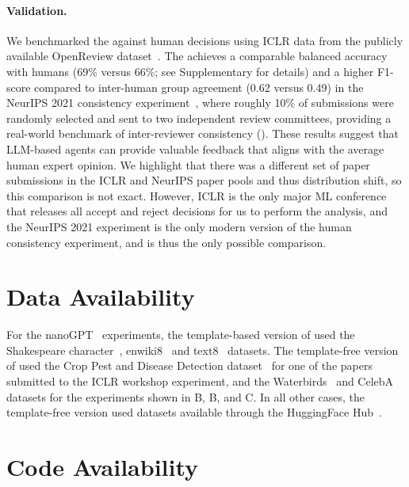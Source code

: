 \paragraph{Validation.}

We benchmarked the \ourreviewer against human decisions using ICLR data from the publicly available OpenReview dataset~\citep{gonzalez2024learning}. 
The \ourreviewer achieves a comparable balanced accuracy with humans (69\% versus 66\%; see Supplementary  for details) and a higher F1-score compared to inter-human group agreement (0.62 versus 0.49) in the NeurIPS 2021 consistency experiment~\citep{beygelzimer2021neurips}, where roughly 10\% of submissions were randomly selected and sent to two independent review committees, providing a real-world benchmark of inter-reviewer consistency ().
These results suggest that LLM-based agents can provide valuable feedback that aligns with the average human expert opinion.
We highlight that there was a different set of paper submissions in the ICLR and NeurIPS paper pools and thus distribution shift, so this comparison is not exact.
However, ICLR is the only major ML conference that releases all accept and reject decisions for us to perform the analysis, and the NeurIPS 2021 experiment is the only modern version of the human consistency experiment, and is thus the only possible comparison.

\newpage
\section*{Data Availability}

For the nanoGPT~\citep{karpathy2022nanogpt} experiments, the template-based version of \ouralgo used the Shakespeare character~\citep{char_shakespeare}, enwiki8~\citep{hutter_prize} and text8~\citep{text8} datasets.
The template-free version of \ouralgo used the Crop Pest and Disease Detection dataset~\citep{mensah2023crop} for one of the papers submitted to the ICLR workshop experiment, and the Waterbirds~\citep{waterbirds_dataset} and CelebA~\citep{liu2015faceattributes} datasets for the experiments shown in B, B, and C.
In all other cases, the template-free version used datasets available through the HuggingFace Hub~\citep{wolf2020huggingface}.


\section*{Code Availability}
\label{sec:code_availability}

